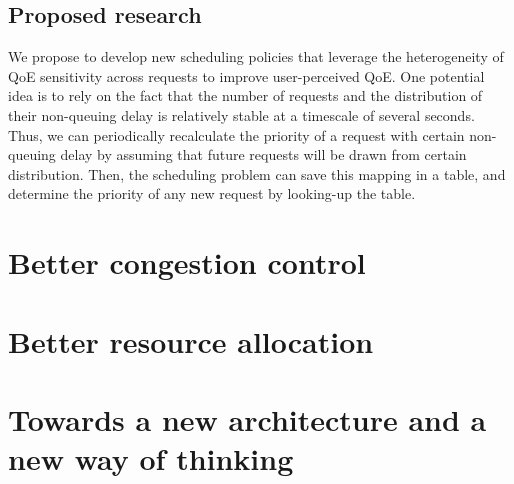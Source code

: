 \subsection{Proposed research}
We propose to develop new scheduling policies that leverage the heterogeneity of QoE sensitivity across requests to improve user-perceived QoE. 
One potential idea is to rely on the fact that the number of requests and the distribution of their non-queuing delay is relatively stable at a timescale of several seconds. 
Thus, we can periodically recalculate the priority of a request with certain non-queuing delay by assuming that future requests will be drawn from certain distribution.
Then, the scheduling problem can save this mapping in a table, and determine the priority of any new request by looking-up the table. 


\section{Better congestion control}

\section{Better resource allocation}

\section{Towards a new architecture and a new way of thinking}
\label{sec:arch}



